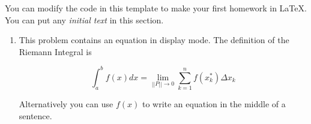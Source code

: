 \documentclass[12pt]{article}
\begin{document}

\noindent
You can modify the code in this template to make your first homework in LaTeX. You can put any \textit{initial text} in this section.


\begin{enumerate}[start=1,label={\bfseries Question \arabic*:},leftmargin=1in] %
    \item This problem contains an equation in display mode. The definition of the Riemann Integral is

    \[ \int_a^bf(x)dx=\lim_{||P||\rightarrow 0}\sum_{k=1}^nf(x_k^*)\Delta x_k\]

    Alternatively you can use $f(x)$ to write an equation in the middle of a sentence.
\end{enumerate}
\end{document}
